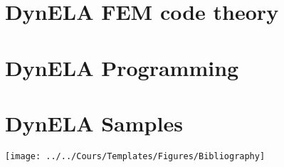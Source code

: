 \documentclass[11pt,french,english,twoside]{book}
\begin{document}


\dominitoc{}\setcounter{page}{1}

\tableofcontents{}

\listoffigures

\listoftables

\cleardoublepage

\renewcommand{\thepage}{\arabic{page}}\setcounter{page}{1}

\part{DynELA FEM code theory}



\cleardoublepage

\part{DynELA Programming}

 





\cleardoublepage

\part{DynELA Samples}







\cleardoublepage

\cite{pantale_parallelization_2005}



\begin{center}
\texttt{[image: ../../Cours/Templates/Figures/Bibliography]}
\par\end{center}

\cleardoublepage

\printindex
\end{document}
